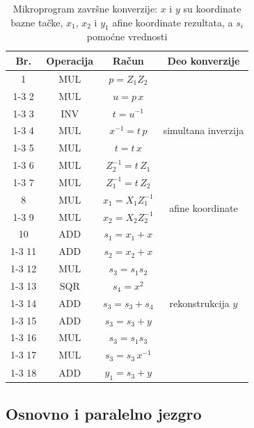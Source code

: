 \begin{table}[H]
\caption{Mikroprogram završne konverzije: $x$ i $y$ su koordinate bazne tačke, $x_1$, $x_2$ i $y_1$ afine koordinate rezultata, a $s_i$ pomoćne vrednosti}
\centering
{\renewcommand{\arraystretch}{1.15}\small
\begin{tabular}{|c|c|c|c|}
\hline
\rowcolor{gray!30}
Br. & Operacija & Račun & Deo konverzije \\
\hline
1 & MUL & $p = Z_1 Z_2$ & \multirow{7}{*}{simultana inverzija} \\
\cline{1-3}
2 & MUL & $u = p\,x$ & \\
\cline{1-3}
3 & INV & $t = u^{-1}$ & \\
\cline{1-3}
4 & MUL & $x^{-1} = t\,p$ & \\
\cline{1-3}
5 & MUL & $t = t\,x$ & \\
\cline{1-3}
6 & MUL & $Z_2^{-1} = t\,Z_1$ & \\
\cline{1-3}
7 & MUL & $Z_1^{-1} = t\,Z_2$ & \\
\hline
8 & MUL & $x_1 = X_1 Z_1^{-1}$ & \multirow{2}{*}{afine koordinate} \\
\cline{1-3}
9 & MUL & $x_2 = X_2 Z_2^{-1}$ & \\
\hline
10 & ADD & $s_1 = x_1 + x$ & \multirow{9}{*}{rekonstrukcija $y$} \\
\cline{1-3}
11 & ADD & $s_2 = x_2 + x$ & \\
\cline{1-3}
12 & MUL & $s_3 = s_1 s_2$ & \\
\cline{1-3}
13 & SQR & $s_4 = x^2$ & \\
\cline{1-3}
14 & ADD & $s_3 = s_3 + s_4$ & \\
\cline{1-3}
15 & ADD & $s_3 = s_3 + y$ & \\
\cline{1-3}
16 & MUL & $s_3 = s_1 s_3$ & \\
\cline{1-3}
17 & MUL & $s_3 = s_3\,x^{-1}$ & \\
\cline{1-3}
18 & ADD & $y_1 = s_3 + y$ & \\
\hline
\end{tabular}
}
\label{tab:ecdh_mxy}
\end{table}

\subsection{Osnovno i paralelno jezgro}
\label{subsec:hw_ecdh_dva}

